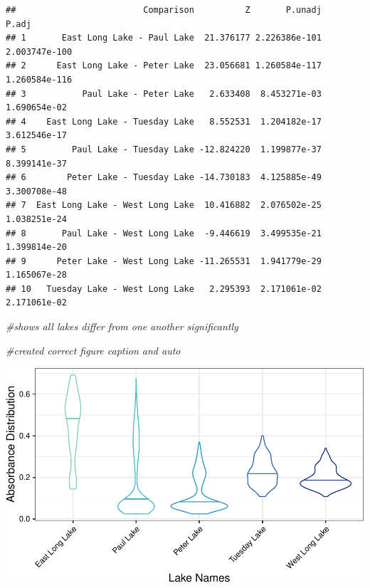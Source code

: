 \documentclass[12pt,]{article}
\newenvironment{Shaded}{\begin{snugshade}}{\end{snugshade}}
\newcommand{\KeywordTok}[1]{\textcolor[rgb]{0.13,0.29,0.53}{\textbf{#1}}}
\newcommand{\StringTok}[1]{\textcolor[rgb]{0.31,0.60,0.02}{#1}}
\newcommand{\CommentTok}[1]{\textcolor[rgb]{0.56,0.35,0.01}{\textit{#1}}}
\newcommand{\OperatorTok}[1]{\textcolor[rgb]{0.81,0.36,0.00}{\textbf{#1}}}
\newcommand{\NormalTok}[1]{#1}
\begin{document}
\begin{Shaded}
\end{Shaded}

\begin{verbatim}
##                         Comparison          Z       P.unadj         P.adj
## 1       East Long Lake - Paul Lake  21.376177 2.226386e-101 2.003747e-100
## 2      East Long Lake - Peter Lake  23.056681 1.260584e-117 1.260584e-116
## 3           Paul Lake - Peter Lake   2.633408  8.453271e-03  1.690654e-02
## 4    East Long Lake - Tuesday Lake   8.552531  1.204182e-17  3.612546e-17
## 5         Paul Lake - Tuesday Lake -12.824220  1.199877e-37  8.399141e-37
## 6        Peter Lake - Tuesday Lake -14.730183  4.125885e-49  3.300708e-48
## 7  East Long Lake - West Long Lake  10.416882  2.076502e-25  1.038251e-24
## 8       Paul Lake - West Long Lake  -9.446619  3.499535e-21  1.399814e-20
## 9      Peter Lake - West Long Lake -11.265531  1.941779e-29  1.165067e-28
## 10   Tuesday Lake - West Long Lake   2.295393  2.171061e-02  2.171061e-02
\end{verbatim}

\begin{Shaded}
\begin{Highlighting}[]
\CommentTok{#shows all lakes differ from one another significantly }

\CommentTok{#created correct figure caption and auto}
\end{Highlighting}
\end{Shaded}

\includegraphics{Bash_ENV872_Project_files/figure-latex/vio-1.pdf}
\newpage
\end{document}
